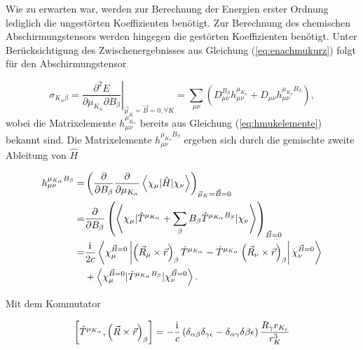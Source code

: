     Wie zu erwarten war, werden zur Berechnung der Energien erster Ordnung lediglich die ungestörten Koeffizienten benötigt. Zur Berechnung des chemischen Abschirmungstensors werden hingegen die gestörten Koeffizienten benötigt. Unter Berücksichtigung des Zwischenergebnisses aus Gleichung (\ref{eq:enachmukurz}) folgt für den Abschirmungstensor
    
    \begin{equation}
    \sigma_{K_\alpha\beta}=\left.\frac{\partial^2 E}{\partial \mu_{K_\alpha}\partial B_\beta}\right|_{\vec{\mu}_K=\vec{B}=0,\forall K}=\sum_{\mu\nu}\left(D_{\mu\nu}^{B_\beta}h_{\mu\nu}^{\mu_{K_\alpha}}+D_{\mu\nu}h_{\mu\nu}^{\mu_{K_\alpha}B_\beta}\right),
    \end{equation}
    wobei die Matrixelemente $h_{\mu\nu}^{\mu_{K_\alpha}}$ bereits aus Gleichung (\ref{eq:hmukelemente}) bekannt sind. Die Matrixelemente $h_{\mu\nu}^{\mu_{K_\alpha}B_\beta}$ ergeben sich durch die gemischte zweite Ableitung von $\hat{H}$
    
    \begin{equation}
    \begin{aligned}
    h_{\mu\nu}^{\mu_{K_\alpha}B_\beta}=&\left(\frac{\partial}{\partial B_\beta}\frac{\partial}{\partial \mu_{K_\alpha}}\left\langle\chi_\mu\vert\hat{H}\vert\chi_\nu \right\rangle\right)_{\vec{\mu}_K=\vec{B}=0}\\
    =&\frac{\partial}{\partial B_\beta}\left(\left\langle\chi_\mu\vert\hat{T}^{\mu_{K_\alpha}}+\sum_\beta B_\beta \hat{T}^{\mu_{K_\alpha}B_\beta}\vert\chi_\nu\right\rangle\right)_{\vec{B}=0}\\
    =&\frac{\mathrm{i}\mkern1mu}{2c}\left\langle\chi_\mu^{\vec{B}=0}\left\vert\left(\vec{R}_\mu\times\vec{r}\right)_\beta\hat{T}^{\mu_{K_\alpha}}-\hat{T}^{\mu_{K_\alpha}}\left(\vec{R}_\nu\times\vec{r}\right)_\beta\right\vert\chi_\nu^{\vec{B}=0}\right\rangle\\
    &+\left\langle\chi_\mu^{\vec{B}=0}\vert\hat{T}^{\mu_{K_\alpha}B_\beta}\vert\chi_\nu^{\vec{B}=0}\right\rangle.
    \end{aligned}
	\end{equation}     
      
    Mit dem Kommutator\supercite{baron1991}
    
    \begin{equation}
    \left[\hat{T}^{\mu_{K_\alpha}},\left(\vec{R}\times\vec{r}\right)_\beta\right]=-\frac{\mathrm{i}\mkern1mu}{c}\left(\delta_{\alpha\beta}\delta_{\gamma\epsilon}-\delta_{\alpha\gamma}\delta{\beta\epsilon}\right)\frac{R_\gamma r_{K_\epsilon}}{r_K^3}
    \end{equation}
    
